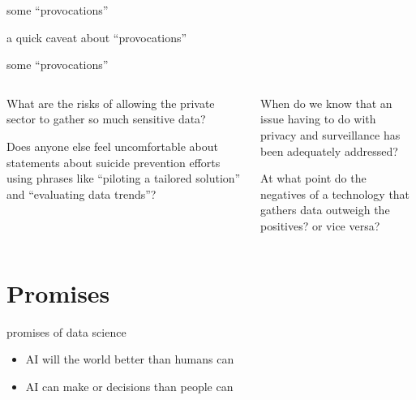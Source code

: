 \documentclass[aspectratio=43,17pt]{beamer} %
\begin{document}
\begin{frame}{some ``provocations''}
\end{frame}


\begin{frame}[plain]
\centering

a quick caveat about ``provocations''

\end{frame}

\begin{frame}{some ``provocations''}
\vspace{2em}
{\footnotesize
\begin{columns}
\begin{column}{0.5\textwidth}
{What are the risks of allowing the private sector to gather so much sensitive data?}

\vspace{1em}

{Does anyone else feel uncomfortable about statements about suicide prevention efforts using phrases like ``piloting a tailored solution'' and ``evaluating data trends''?}

\end{column}

\begin{column}{0.5\textwidth}

{When do we know that an issue having to do with privacy and surveillance has been adequately addressed?}

\vspace{1em}

{At what point do the negatives of a technology that gathers data outweigh the positives? or vice versa?}


\end{column}
\end{columns}}

\end{frame}


%





\section{Promises}


\begin{frame}{promises of data science}

\begin{itemize}
    \item AI will  the world better than humans can
    \item AI can make  or  decisions than people can
\end{itemize}

\end{frame}
\end{document}
